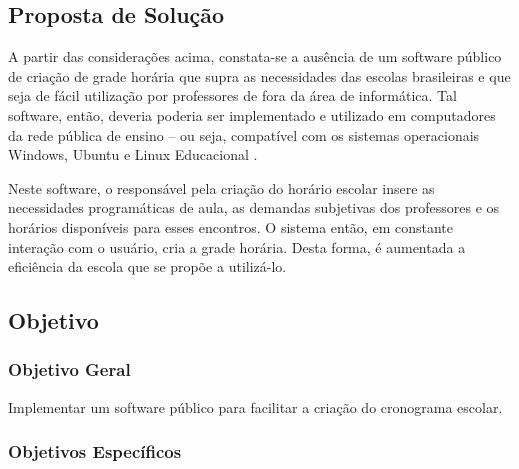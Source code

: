 \documentclass[12pt,a4paper]{article}
\begin{document}
		\subsection{Proposta de Solução}

			 \par A partir das considerações acima, constata-se a ausência de um software público \cite{publico} de criação de grade horária que supra as necessidades das escolas brasileiras e que seja de fácil utilização por professores de fora da área de informática. Tal software, então, deveria poderia ser implementado e utilizado em computadores da rede pública de ensino -- ou seja, compatível com os sistemas operacionais Windows, Ubuntu e Linux Educacional \cite{proinfo,w3s}.

			 \par Neste software, o responsável pela criação do horário escolar insere as necessidades programáticas de aula, as demandas subjetivas dos professores e os horários disponíveis para esses encontros. O sistema então, em constante interação com o usuário, cria a grade horária. Desta forma, é aumentada a eficiência da escola que se propõe a utilizá-lo.

		\subsection{Objetivo}

			\subsubsection{Objetivo Geral}

				\par Implementar um software público para facilitar a criação do cronograma escolar.

			\subsubsection{Objetivos Específicos}
\end{document}
